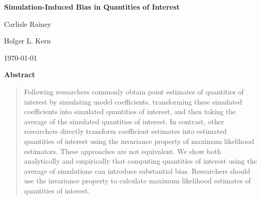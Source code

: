 \documentclass[11pt]{article}
\begin{document}
\begin{center}

{\Large \textbf{Simulation-Induced Bias in Quantities of Interest}}

\vspace{1cm}

Carlisle Rainey

\vspace{2mm}

Holger L. Kern

\vspace{1cm}

\today
\end{center}

\vspace{5mm}

{\centerline{\textbf{Abstract}}}
\begin{quote}\noindent
Following \cite{KingTomzWittenberg2000} researchers commonly obtain point estimates of quantities of interest by simulating model coefficients, transforming these simulated coefficients into simulated quantities of interest, and then taking the average of the simulated quantities of interest. In contrast, other researchers directly transform coefficient estimates into estimated quantities of interest using the invariance property of maximum likelihood estimators. These approaches are not equivalent. We show both analytically and empirically that computing quantities of interest using the average of simulations can introduce substantial bias. Researchers should use the invariance property to calculate maximum likelihood estimates of quantities of interest.\\
\end{quote}
\end{document}
